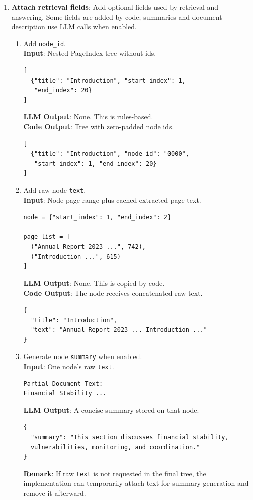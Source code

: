 \documentclass[11pt,a4paper]{article}
\newcommand{\fieldname}[1]{\textcolor{red!70!black}{\texttt{#1}}}
\begin{document}
\begin{enumerate}
    \item \textbf{Attach retrieval fields}: Add optional fields used by retrieval and answering. Some fields are added by code; summaries and document description use LLM calls when enabled.
    \begin{enumerate}[label=(\alph*)]
        \item Add \fieldname{node\_id}. \\
        \textbf{Input}: Nested PageIndex tree without ids.
\begin{lstlisting}[style=pageTextBlockInList]
[
  {"title": "Introduction", "start_index": 1,
   "end_index": 20}
]
\end{lstlisting}
        \textbf{LLM Output}: None. This is rules-based. \\
        \textbf{Code Output}: Tree with zero-padded node ids.
\begin{lstlisting}[style=pageTextBlockInList]
[
  {"title": "Introduction", "node_id": "0000",
   "start_index": 1, "end_index": 20}
]
\end{lstlisting}

        \item Add raw node \fieldname{text}. \\
        \textbf{Input}: Node page range plus cached extracted page text.
\begin{lstlisting}[style=pageTextBlockInList]
node = {"start_index": 1, "end_index": 2}

page_list = [
  ("Annual Report 2023 ...", 742),
  ("Introduction ...", 615)
]
\end{lstlisting}
        \textbf{LLM Output}: None. This is copied by code. \\
        \textbf{Code Output}: The node receives concatenated raw text.
\begin{lstlisting}[style=pageTextBlockInList]
{
  "title": "Introduction",
  "text": "Annual Report 2023 ... Introduction ..."
}
\end{lstlisting}

        \item Generate node \fieldname{summary} when enabled. \\
        \textbf{Input}: One node's raw \fieldname{text}.
\begin{lstlisting}[style=pageTextBlockInList]
Partial Document Text:
Financial Stability ...
\end{lstlisting}
        \textbf{LLM Output}: A concise summary stored on that node.
\begin{lstlisting}[style=pageTextBlockInList]
{
  "summary": "This section discusses financial stability,
  vulnerabilities, monitoring, and coordination."
}
\end{lstlisting}
        \textbf{Remark}: If raw \fieldname{text} is not requested in the final tree, the implementation can temporarily attach text for summary generation and remove it afterward.


\end{enumerate}
\end{enumerate}
\end{document}
